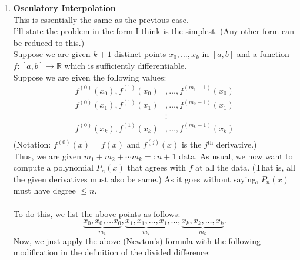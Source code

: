\documentclass[12pt]{article}
\theoremstyle{definition}
\newtheorem{thm}{Theorem}
\begin{document}
\begin{enumerate}
	Also, the exact value of $f$ at a point is given as
	\begin{equation*} 
		f(x) = P_n(x) + f[x_0, \ldots, x_n, x]\Psi_n(x),
	\end{equation*}
	where $\Psi_n(x) = (x - x_0)\cdots(x - x_n).$

	\begin{thm}
		Let $x_0, \ldots, x_k \in [a, b]$ and $f$ be $k + 1$ times differentiable. Then,
		\begin{equation*} 
			f[x_0, \ldots, x_k] = \frac{f^{(k + 1)}(\xi)}{(k + 1)!}
		\end{equation*}
		for some $\xi \in [a, b].$
	\end{thm}


	\item \textbf{Osculatory Interpolation}\\
	This is essentially the same as the previous case. \\
	I'll state the problem in the form I think is the simplest. (Any other form can be reduced to this.)\\
	Suppose we are given $k+1$ distinct points $x_0, \ldots, x_k$ in $[a, b]$ and a function $f:[a, b] \to \mathbb{R}$ which is sufficiently differentiable.\\
	Suppose we are given the following values:\\
	\begin{align*} 
		f^{(0)}(x_0), f^{(1)}(x_0)&, \ldots, f^{(m_1-1)}(x_0)\\
		f^{(0)}(x_1), f^{(1)}(x_1)&, \ldots, f^{(m_2-1)}(x_1)\\
		&\vdots\\
		f^{(0)}(x_k), f^{(1)}(x_k)&, \ldots, f^{(m_k-1)}(x_k)\\
	\end{align*}
	(Notation: $f^{(0)}(x) = f(x)$ and $f^{(j)}(x)$ is the $j^{\text{th}}$ derivative.)\\
	Thus, we are given $m_1 + m_2 + \cdots m_k =: n+1$ data. As usual, we now want to compute a polynomial $P_n(x)$ that agrees with $f$ at all the data. (That is, all the given derivatives must also be same.) As it goes without saying, $P_n(x)$ must have degree $\le n.$\\~\\
	To do this, we list the above points as follows:
	\[\underbrace{x_0, x_0, \ldots x_0}_{m_1}, \underbrace{x_1, x_1, \ldots, x_1}_{m_2}, \ldots, \underbrace{x_k, x_k, \ldots, x_k}_{m_k}.\]
	Now, we just apply the above (Newton's) formula with the following modification in the definition of the divided difference:

\end{enumerate}
\end{document}
